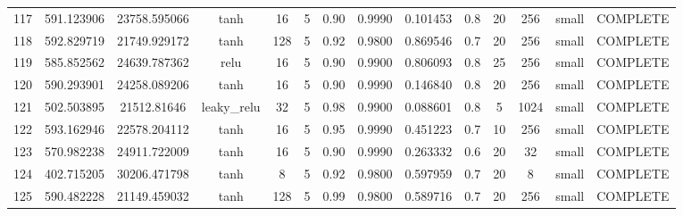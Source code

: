 \begin{longtable}{cccccccccccccc}
                      117 &                 591.123906 &                       23758.595066 &            tanh &          16 &              5 &        0.90 & 0.9990 &       0.101453 &             0.8 &                 20 &      256 &     small & COMPLETE \\
                      118 &                 592.829719 &                       21749.929172 &            tanh &         128 &              5 &        0.92 & 0.9800 &       0.869546 &             0.7 &                 20 &      256 &     small & COMPLETE \\
                      119 &                 585.852562 &                       24639.787362 &            relu &          16 &              5 &        0.90 & 0.9900 &       0.806093 &             0.8 &                 25 &      256 &     small & COMPLETE \\
                      120 &                 590.293901 &                       24258.089206 &            tanh &          16 &              5 &        0.90 & 0.9990 &       0.146840 &             0.8 &                 20 &      256 &     small & COMPLETE \\
                      121 &                 502.503895 &                        21512.81646 &     leaky\_relu &          32 &              5 &        0.98 & 0.9900 &       0.088601 &             0.8 &                  5 &     1024 &     small & COMPLETE \\
                      122 &                 593.162946 &                       22578.204112 &            tanh &          16 &              5 &        0.95 & 0.9990 &       0.451223 &             0.7 &                 10 &      256 &     small & COMPLETE \\
                      123 &                 570.982238 &                       24911.722009 &            tanh &          16 &              5 &        0.90 & 0.9990 &       0.263332 &             0.6 &                 20 &       32 &     small & COMPLETE \\
                      124 &                 402.715205 &                       30206.471798 &            tanh &           8 &              5 &        0.92 & 0.9800 &       0.597959 &             0.7 &                 20 &        8 &     small & COMPLETE \\
                      125 &                 590.482228 &                       21149.459032 &            tanh &         128 &              5 &        0.99 & 0.9800 &       0.589716 &             0.7 &                 20 &      256 &     small & COMPLETE \\

\end{longtable}
